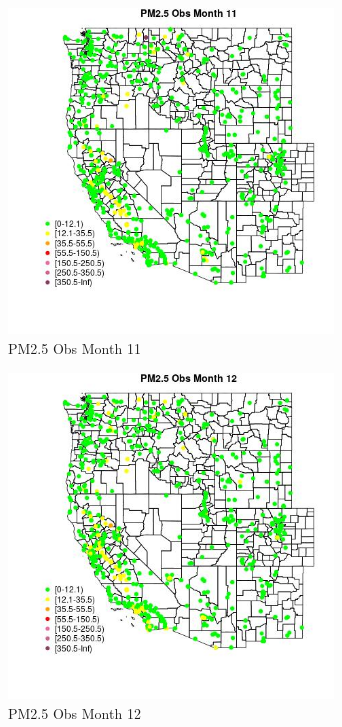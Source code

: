 \begin{figure} 
\centering  
\includegraphics[width=0.77\textwidth]{Code_Outputs/Report_ML_input_PM25_Step4_part_e_de_duplicated_aves_compiled_2019-05-21wNAs_MapObsMo11PM25_Obs.jpg} 
\caption{\label{fig:Report_ML_input_PM25_Step4_part_e_de_duplicated_aves_compiled_2019-05-21wNAsMapObsMo11PM25_Obs}PM2.5 Obs Month 11} 
\end{figure} 
 

\begin{figure} 
\centering  
\includegraphics[width=0.77\textwidth]{Code_Outputs/Report_ML_input_PM25_Step4_part_e_de_duplicated_aves_compiled_2019-05-21wNAs_MapObsMo12PM25_Obs.jpg} 
\caption{\label{fig:Report_ML_input_PM25_Step4_part_e_de_duplicated_aves_compiled_2019-05-21wNAsMapObsMo12PM25_Obs}PM2.5 Obs Month 12} 
\end{figure} 
 

